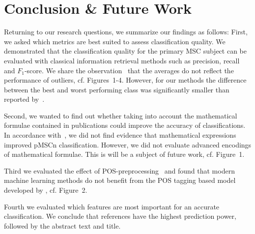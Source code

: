\section{Conclusion \& Future Work}\label{sec.concl}
Returning to our research questions, we summarize our findings as follows:
First, we asked which metrics are best suited to assess classification quality.
We demonstrated that the classification quality for the primary MSC subject can be evaluated with classical information retrieval methods such as precision, recall and \(F_{1}\)-score.
We share the observation~\cite{BarthelTB13} that the averages do not reflect the performance of outliers, cf. Figures~1-4.
However, for our methods the difference between the best and worst performing class was significantly smaller than reported by~\cite{BarthelTB13}.

Second, we wanted to find out whether taking into account the mathematical formulae contained in publications could improve the accuracy of classifications.
In accordance with~\cite{Scharpf2020}, we did not find evidence that mathematical expressions improved pMSCn classification.
However, we did not evaluate advanced encodings of mathematical formulae. This is will be a subject of future work, cf. Figure~1.



Third we evaluated the effect of POS-preprocessing~\cite{SchonebergS14} and found that modern machine learning methods do not benefit from the POS tagging based model developed by \cite{SchonebergS14}, cf. Figure~2.


Fourth we evaluated which features are most important for an accurate classification.
We conclude that references have the highest prediction power, followed by the abstract text and title.


